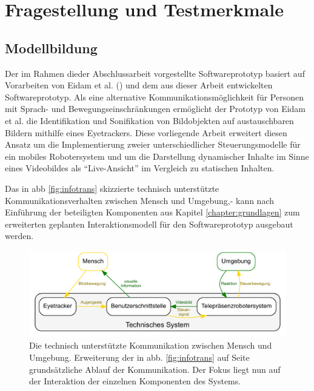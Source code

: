 

\chapter{Fragestellung und Testmerkmale}
\label{chapter:fragestellung}

\section{Modellbildung}
\label{section:modellbildung}
Der im Rahmen dieder Abschlussarbeit vorgestellte Softwareprototyp basiert auf Vorarbeiten von Eidam et al. (\vgl \cite{Eidam2015,Eidam2016}) und dem aus dieser Arbeit entwickelten Softwareprototyp. Als eine alternative Kommunikationsmöglichkeit für Personen mit Sprach- und Bewegungseinschränkungen ermöglicht der Prototyp von Eidam et al. die Identifikation und Sonifikation von Bildobjekten auf austauschbaren Bildern mithilfe eines Eyetrackers. Diese vorliegende Arbeit erweitert diesen Ansatz um die Implementierung zweier unterschiedlicher Steuerungsmodelle für ein mobiles Robotersystem und um die Darstellung dynamischer Inhalte im Sinne eines Videobildes als \enquote{Live-Ansicht} im Vergleich zu statischen Inhalten.

Das in \acs{abb} \ref{fig:infotrans} skizzierte technisch unterstützte Kommunikationsverhalten zwischen Mensch und Umgebung,- kann nach Einführung der beteiligten Komponenten aus Kapitel \ref{chapter:grundlagen} zum erweiterten geplanten Interaktionsmodell für den Softwareprototyp ausgebaut werden.

\begin{figure}[ht]
\begin{minipage}[t]{\linewidth} 
      \centering 
\includegraphics[width=\textwidth]{bilder/implementierung/komptrans.pdf}
   \end{minipage}%
\caption{Die technisch unterstützte Kommunikation zwischen Mensch und Umgebung. Erweiterung der in \acs{abb}. \ref{fig:infotrans} auf Seite \pageref{fig:infotrans} grundsätzliche Ablauf der Kommunikation. Der Fokus liegt nun auf der Interaktion der einzelnen Komponenten des Systems.}
\label{fig:infotrans2}
\end{figure}

